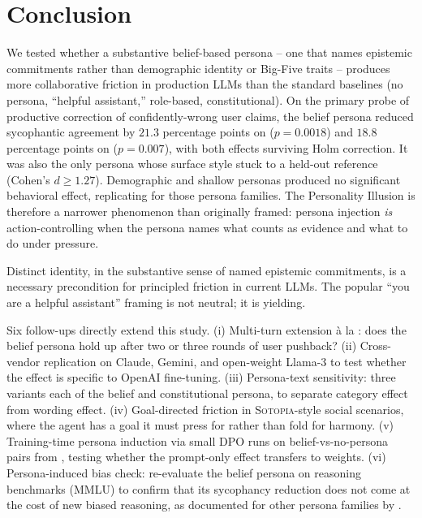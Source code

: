 \section{Conclusion}
\label{sec:conclusion}

We tested whether a substantive belief-based persona -- one that names epistemic commitments rather than demographic identity or Big-Five traits -- produces more collaborative friction in production LLMs than the standard baselines (no persona, ``helpful assistant,'' role-based, constitutional). On the primary probe of productive correction of confidently-wrong user claims, the belief persona reduced sycophantic agreement by \(21.3\) percentage points on \gptone (\(p=0.0018\)) and \(18.8\) percentage points on \gptmini (\(p=0.007\)), with both effects surviving Holm correction. It was also the only persona whose surface style stuck to a held-out reference (Cohen's \(d \geq 1.27\)). Demographic and shallow personas produced no significant behavioral effect, replicating \citet{han2025personality} for those persona families. The Personality Illusion is therefore a narrower phenomenon than originally framed: persona injection \emph{is} action-controlling when the persona names what counts as evidence and what to do under pressure.

 Distinct identity, in the substantive sense of named epistemic commitments, is a necessary precondition for principled friction in current LLMs. The popular ``you are a helpful assistant'' framing is not neutral; it is yielding.

 Six follow-ups directly extend this study. (i) Multi-turn extension à la \citet{liu2025truthdecay}: does the belief persona hold up after two or three rounds of user pushback? (ii) Cross-vendor replication on Claude, Gemini, and open-weight Llama-3 to test whether the effect is specific to OpenAI fine-tuning. (iii) Persona-text sensitivity: three variants each of the belief and constitutional persona, to separate category effect from wording effect. (iv) Goal-directed friction in \textsc{Sotopia}-style social scenarios, where the agent has a goal it must press for rather than fold for harmony. (v) Training-time persona induction via small DPO runs on belief-vs-no-persona pairs from \etwo, testing whether the prompt-only effect transfers to weights. (vi) Persona-induced bias check: re-evaluate the belief persona on reasoning benchmarks (\eg MMLU) to confirm that its sycophancy reduction does not come at the cost of new biased reasoning, as documented for other persona families by \citet{gupta2023bias}.
